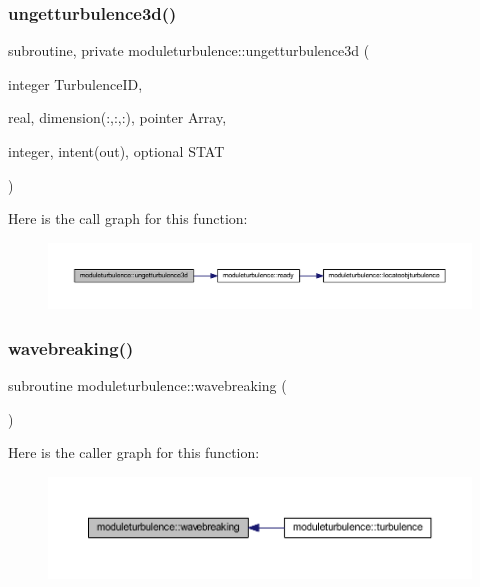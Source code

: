 \subsubsection{\texorpdfstring{ungetturbulence3d()}{ungetturbulence3d()}}
{\footnotesize\ttfamily subroutine, private moduleturbulence\+::ungetturbulence3d (\begin{DoxyParamCaption}\item[{integer}]{Turbulence\+ID,  }\item[{real, dimension(\+:,\+:,\+:), pointer}]{Array,  }\item[{integer, intent(out), optional}]{S\+T\+AT }\end{DoxyParamCaption})\hspace{0.3cm}{\ttfamily [private]}}

Here is the call graph for this function\+:\nopagebreak
\begin{figure}[H]
\begin{center}
\leavevmode
\includegraphics[width=350pt]{namespacemoduleturbulence_a3efe4fb95ca7fe2eff42a33023683bd8_cgraph}
\end{center}
\end{figure}
\mbox{\label{namespacemoduleturbulence_a60c4e6500b8bfaf5e8e8a202db2203ba}} 
\subsubsection{\texorpdfstring{wavebreaking()}{wavebreaking()}}
{\footnotesize\ttfamily subroutine moduleturbulence\+::wavebreaking (\begin{DoxyParamCaption}{ }\end{DoxyParamCaption})\hspace{0.3cm}{\ttfamily [private]}}

Here is the caller graph for this function\+:\nopagebreak
\begin{figure}[H]
\begin{center}
\leavevmode
\includegraphics[width=350pt]{namespacemoduleturbulence_a60c4e6500b8bfaf5e8e8a202db2203ba_icgraph}
\end{center}
\end{figure}
\mbox{\label{namespacemoduleturbulence_a256cd0709bb85cc0f9cd463e00938709}} 
